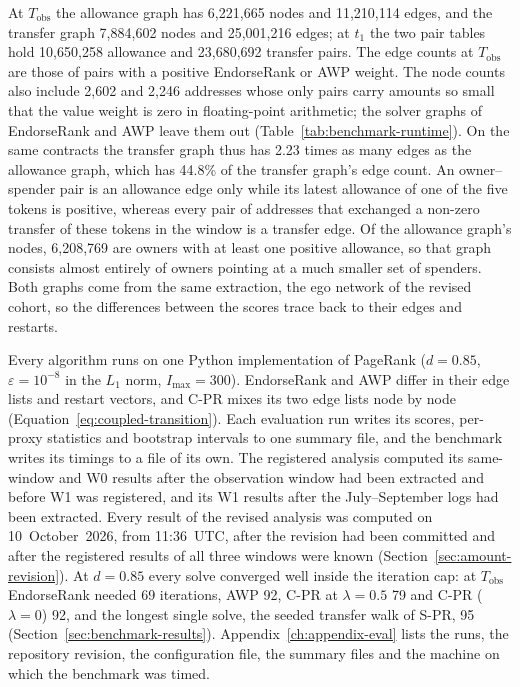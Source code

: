 At $T_{\mathrm{obs}}$ the allowance graph has 6,221,665 nodes and 11,210,114 edges, and the transfer graph 7,884,602 nodes and 25,001,216 edges; at $t_1$ the two pair tables hold 10,650,258 allowance and 23,680,692 transfer pairs. The edge counts at $T_{\mathrm{obs}}$ are those of pairs with a positive EndorseRank or AWP weight. The node counts also include 2,602 and 2,246 addresses whose only pairs carry amounts so small that the value weight is zero in floating-point arithmetic; the solver graphs of EndorseRank and AWP leave them out (Table~\ref{tab:benchmark-runtime}). On the same contracts the transfer graph thus has 2.23 times as many edges as the allowance graph, which has 44.8\% of the transfer graph's edge count. An owner--spender pair is an allowance edge only while its latest allowance of one of the five tokens is positive, whereas every pair of addresses that exchanged a non-zero transfer of these tokens in the window is a transfer edge. Of the allowance graph's nodes, 6,208,769 are owners with at least one positive allowance, so that graph consists almost entirely of owners pointing at a much smaller set of spenders. Both graphs come from the same extraction, the ego network of the revised cohort, so the differences between the scores trace back to their edges and restarts.


Every algorithm runs on one Python implementation of PageRank ($d=0.85$, $\varepsilon=10^{-8}$ in the $L_1$ norm, $I_{\max}=300$). EndorseRank and AWP differ in their edge lists and restart vectors, and C-PR mixes its two edge lists node by node (Equation~\eqref{eq:coupled-transition}). Each evaluation run writes its scores, per-proxy statistics and bootstrap intervals to one summary file, and the benchmark writes its timings to a file of its own. The registered analysis computed its same-window and W0 results after the observation window had been extracted and before W1 was registered, and its W1 results after the July--September logs had been extracted. Every result of the revised analysis was computed on 10~October~2026, from 11:36~UTC, after the revision had been committed and after the registered results of all three windows were known (Section~\ref{sec:amount-revision}). At $d=0.85$ every solve converged well inside the iteration cap: at $T_{\mathrm{obs}}$ EndorseRank needed 69 iterations, AWP 92, C-PR at $\lambda=0.5$ 79 and C-PR ($\lambda=0$) 92, and the longest single solve, the seeded transfer walk of S-PR, 95 (Section~\ref{sec:benchmark-results}). Appendix~\ref{ch:appendix-eval} lists the runs, the repository revision, the configuration file, the summary files and the machine on which the benchmark was timed.

